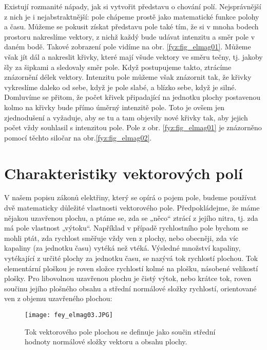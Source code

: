       Existují rozmanité nápady, jak si vytvořit představu o chování polí. Nejsprávnější z nich je i
      nejabstraktnější: pole chápeme prostě jako matematické funkce polohy a času. Můžeme se pokusit získat 
      představu pole také tím, že si v mnoha bodech prostoru nakreslíme vektory, z nichž každý bude udávat 
      intenzitu a směr pole v daném bodě. Takové zobrazení pole vidíme na obr. \ref{fyz:fig_elmag01}. Můžeme 
      však jít dál a nakreslit křivky, které mají všude vektory ve směru tečny, tj. jakoby šly za šipkami a 
      sledovaly směr pole. Když postupujeme takto, ztrácíme znázornění délek vektory. Intenzitu pole můžeme 
      však znázornit tak, že křivky vykreslíme daleko od sebe, když je pole slabé, a blízko sebe, když je 
      silné. Domluvíme se přitom, že počet křivek připadající na jednotku plochy postavenou kolmo na křivky 
      bude přímo úměrný intenzitě pole. Toto je ovšem jen zjednodušení a vyžaduje, aby se tu a tam objevily 
      nové křivky tak, aby jejich počet vždy souhlasil s intenzitou pole. Pole z obr. \ref{fyz:fig_elmag01} 
      je znázorněno pomocí těchto siločar na obr.\ref{fyz:fig_elmag02}.

        
  \section{Charakteristiky vektorových polí}
    \cite[s.~16]{Feynman02} V našem popisu zákonů elektřiny, který se opírá o pojem pole, budeme používat 
    dvě matematicky důležité vlastnosti vektorového pole. Předpokládejme, že máme nějakou uzavřenou plochu, 
    a ptáme se, zda se „něco“ ztrácí z jejího nitra, tj. zda má pole vlastnost „výtoku“. Například v 
    případě rychlostního pole bychom se mohli ptát, zda rychlost směřuje vždy ven z plochy, nebo obecněji, 
    zda víc kapaliny (za jednotku času) vytéká než vtéká. Výsledné množství kapaliny, vytékající z určité 
    plochy za jednotku času, se nazývá tok rychlostí plochou. Tok elementární ploškou je roven složce 
    rychlostí kolmé na plošku, násobené velikostí plošky. Pro libovolnou uzavřenou plochu je čistý výtok, 
    nebo krátce tok, roven součinu jejího plošného obsahu a střední normálové složky rychlostí, orientované 
    ven z objemu uzavřeného plochou:    

    \begin{figure}[ht!]
      \centering
      \texttt{[image: fey\_elmag03.JPG]}
      \caption{Tok vektorového pole plochou se definuje jako součin střední hodnoty normálové složky vektoru 
        a obsahu plochy.}
      \label{fyz:fig_fey_elmag03} 
    \end{figure}
    
